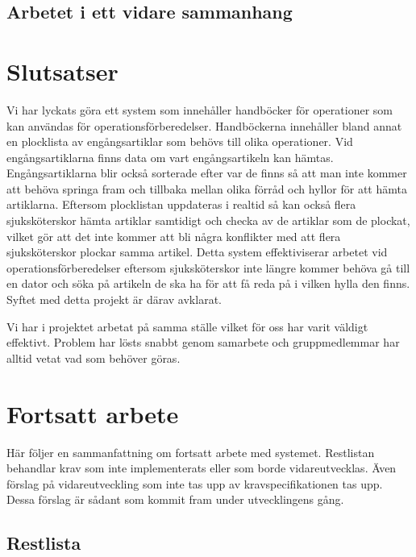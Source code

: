 \documentclass{article}
\begin{document}
\subsection{Arbetet i ett vidare sammanhang}

\section{Slutsatser}
Vi har lyckats göra ett system som innehåller handböcker för operationer som kan användas för operationsförberedelser. Handböckerna innehåller bland annat en plocklista av engångsartiklar som behövs till olika operationer. Vid engångsartiklarna finns data om vart engångsartikeln kan hämtas. Engångsartiklarna blir också sorterade efter var de finns så att man inte kommer att behöva springa fram och tillbaka mellan olika förråd och hyllor för att hämta artiklarna. Eftersom plocklistan uppdateras i realtid så kan också flera sjuksköterskor hämta artiklar samtidigt och checka av de artiklar som de plockat, vilket gör att det inte kommer att bli några konflikter med att flera sjuksköterskor plockar samma artikel. Detta system effektiviserar arbetet vid operationsförberedelser eftersom sjuksköterskor inte längre kommer behöva gå till en dator och söka på artikeln de ska ha för att få reda på i vilken hylla den finns. Syftet med detta projekt är därav avklarat.

Vi har i projektet arbetat på samma ställe vilket för oss har varit väldigt effektivt. Problem har lösts snabbt genom samarbete och gruppmedlemmar har alltid vetat vad som behöver göras.

\section{Fortsatt arbete}
Här följer en sammanfattning om fortsatt arbete med systemet. Restlistan behandlar krav som inte implementerats eller som borde vidareutvecklas. Även förslag på vidareutveckling som inte tas upp av kravspecifikationen tas upp. Dessa förslag är sådant som kommit fram under utvecklingens gång.

\subsection{Restlista}
\end{document}
